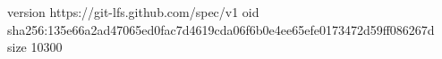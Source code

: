 version https://git-lfs.github.com/spec/v1
oid sha256:135e66a2ad47065ed0fac7d4619cda06f6b0e4ee65efe0173472d59ff086267d
size 10300
